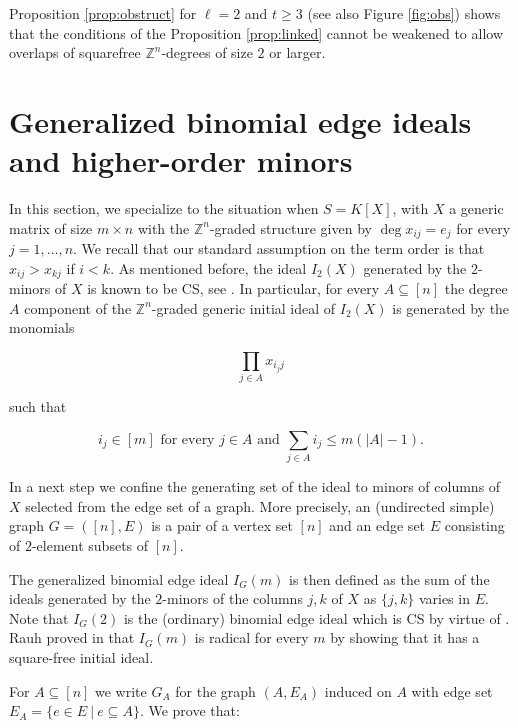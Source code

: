 \documentclass{amsart}
\theoremstyle{definition}
\numberwithin{equation}{section}
\def\ZZ{\mathbb{Z}}
\begin{document}
   Proposition \ref{prop:obstruct} for $\ell = 2$ and $t \geq 3$ (see also
Figure \ref{fig:obs}) shows that the conditions of the Proposition \ref{prop:linked} cannot be weakened to allow 
overlaps of squarefree $\ZZ^ n$-degrees of size $2$ or larger. 


\section{Generalized binomial edge ideals and higher-order minors}
\label{Gen}
In this section, we specialize to the situation when 
 $S=K[X]$, with $X$ a generic matrix of size $m\times n$
 with the $\ZZ^n$-graded structure given by $\deg x_{ij} = e_j$ for every $j=1,\ldots, n$. We recall that our standard assumption on the term order is that 
 $x_{ij}>x_{kj}$ if $i<k$. 
 As mentioned before, the ideal $I_2(X)$ generated by the 
 $2$-minors of $X$ is known
 to be CS, see \cite[Theorem 2.1]{CS}. In particular, for every $A\subseteq  [n]$
 the degree $A$ component of the $\ZZ^n$-graded generic initial ideal of $I_2(X)$ is generated by the monomials

\begin{equation} 
\label{gin}
 \prod_{j\in A} x_{i_jj} 
 \end{equation}  
 
 such that 
 
 \begin{equation} 
\label{cond} 
   i_j\in [m]   \mbox{ for every } j\in A \mbox{  and  } \sum_{j\in A} i_j\leq m(|A|-1).
  \end{equation}   
 
 In a next step we confine the generating set of the ideal to
 minors of columns of $X$ selected from the edge set of a graph. 
 More precisely, an (undirected simple) graph $G = ([n],E)$ is a pair 
 of a vertex set $[n]$ and an edge set $E$ consisting of $2$-element
 subsets of $[n]$. 
 
 The generalized binomial edge ideal $I_G(m)$ is then defined as the 
 sum of the ideals generated by the $2$-minors of the columns
 $j,k$ of $X$ as $\{j,k\}$ varies in $E$.  Note that $I_G(2)$ is the (ordinary) binomial edge ideal which is CS by virtue of \cite{CDG4,CDG5}. 
 Rauh proved in \cite{Rauh} that $I_G(m)$ is radical for every $m$ by showing that it has a square-free initial ideal. 
 
 For $A \subseteq [n]$ we write
 $G_A$ for the graph $(A,E_A)$ induced on $A$ with edge set 
 $E_A = \{ e \in E~|~e \subseteq A\}$.
 We prove that: 
 
\end{document}
